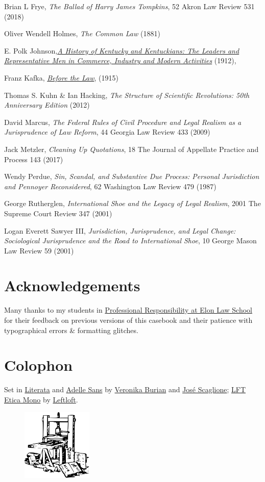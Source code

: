 Brian L Frye, \textit{The Ballad of Harry James Tompkins}, 52 Akron Law Review 531 (2018)

Oliver Wendell Holmes, \textit{The Common Law} (1881)

E. Polk Johnson,\href{https://play.google.com/books/reader?id=FXQUAAAAYAAJ\&pg=GBS.PA1144.w.2.1.0_421}{\textit{A History of Kentucky and Kentuckians: The Leaders and Representative Men in Commerce, Industry and Modern Activities}} (1912), 

Franz Kafka, \href{https://www.kafka-online.info/before-the-law.html}{\textit{Before the Law}}, (1915) 

Thomas S. Kuhn \& Ian Hacking, \textit{The Structure of Scientific Revolutions: 50th Anniversary Edition} (2012)

David Marcus, \textit{The Federal Rules of Civil Procedure and Legal Realism as a Jurisprudence of Law Reform}, 44 Georgia Law Review 433 (2009)

Jack Metzler, \textit{Cleaning Up Quotations}, 18 The Journal of Appellate Practice and Process 143 (2017)

Wendy Perdue, \textit{Sin, Scandal, and Substantive Due Process: Personal Jurisdiction and Pennoyer Reconsidered}, 62 Washington Law Review 479 (1987)

George Rutherglen, \textit{International Shoe and the Legacy of Legal Realism}, 2001 The Supreme Court Review 347 (2001)

Logan Everett Sawyer III, \textit{Jurisdiction, Jurisprudence, and Legal Change: Sociological Jurisprudence and the Road to International Shoe}, 10 George Mason Law Review 59 (2001)


\chapter*{Acknowledgements}

Many thanks to my students in \href{https://www.emfink.net/PR/}{Professional Responsibility at Elon Law School} for their feedback on previous versions of this casebook and their patience with typographical errors \& formatting glitches. 

\chapter*{Colophon}

\raggedright{Set in \href{https://www.type-together.com/literata-font/}{Literata} and \href{https://www.type-together.com/adelle-sans-font/}{Adelle Sans} by \href{https://www.type-together.com/veronika-burian/}{Veronika Burian} and \href{https://www.type-together.com/jose-scaglione/}{José Scaglione}; \href{https://www.type-together.com/lft-etica-mono-font/}{LFT Etica Mono} by \href{https://www.type-together.com/leftloft/}{Leftloft}.}

\begin{figure}
\centering
\includegraphics[width=0.3\textwidth]{../img/gutenberg_press.png}
\end{figure}